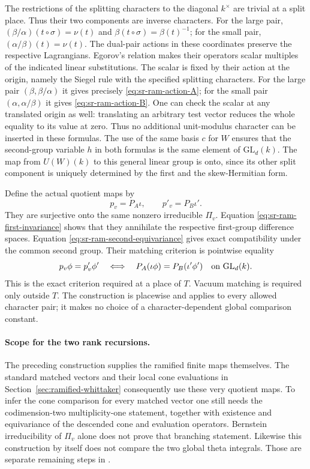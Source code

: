 The restrictions of the splitting characters to the diagonal
\(k^\times\) are trivial at a split place.  Thus their two
components are inverse characters.  For the large pair,
\((\beta/\alpha)(t\circ\sigma)=\nu(t)\) and
\(\beta(t\circ\sigma)=\beta(t)^{-1}\); for the small pair,
\((\alpha/\beta)(t)=\nu(t)\).  The dual-pair actions in these
coordinates preserve the respective Lagrangians.  Egorov's relation makes their operators scalar
multiples of the indicated linear substitutions.  The scalar is
fixed by their action at the origin, namely the Siegel rule with
the specified splitting characters.  For the large pair
\((\beta,\beta/\alpha)\) it gives precisely
\eqref{eq:sr-ram-action-A}; for the small pair
\((\alpha,\alpha/\beta)\) it gives
\eqref{eq:sr-ram-action-B}.  One can check the scalar at any
translated origin as well: translating an arbitrary test vector
reduces the whole equality to its value at zero.  Thus no
additional unit-modulus character can be inserted in these formulas.
The use of the same basis \(c\) for \(W\) ensures that the
second-group variable \(h\) in both formulas is the same
element of \(\mathrm{GL}_d(k)\).  The map from \(U(W)(k)\)
to this general linear group is onto, since its other split
component is uniquely determined by the first and the
skew-Hermitian form.

Define the actual quotient maps by
\[
                         p_v=P_A\iota,\qquad
                         p'_v=P_B\iota'.
\]
They are surjective onto the same nonzero irreducible
\(\Pi_v\).  Equation \eqref{eq:sr-ram-first-invariance} shows
that they annihilate the respective first-group difference
spaces.  Equation \eqref{eq:sr-ram-second-equivariance} gives
exact compatibility under the common second group.
Their matching criterion is pointwise equality
\[
              p_v\phi=p'_v\phi'
        \quad\Longleftrightarrow\quad
              P_A(\iota\phi)=P_B(\iota'\phi')
                    \quad\hbox{on }\mathrm{GL}_d(k).
\]
This is the exact criterion required at a place of \(T\).
Vacuum matching is required only outside \(T\).
The construction is placewise and applies to every allowed
character pair; it makes no choice of a character-dependent
global comparison constant.

\paragraph{Scope for the two rank recursions.}
The preceding construction supplies the ramified finite maps
themselves.  The standard matched vectors and their local cone
evaluations in Section~\ref{sec:ramified-whittaker} consequently
use these very quotient maps.  To infer the cone comparison for
every matched vector one still needs the codimension-two
multiplicity-one statement, together with existence and
equivariance of the descended cone and evaluation operators.
Bernstein irreducibility of \(\Pi_v\) alone does not prove that
branching statement.  Likewise this construction by itself does
not compare the two global theta integrals.  Those are separate
remaining steps in .


